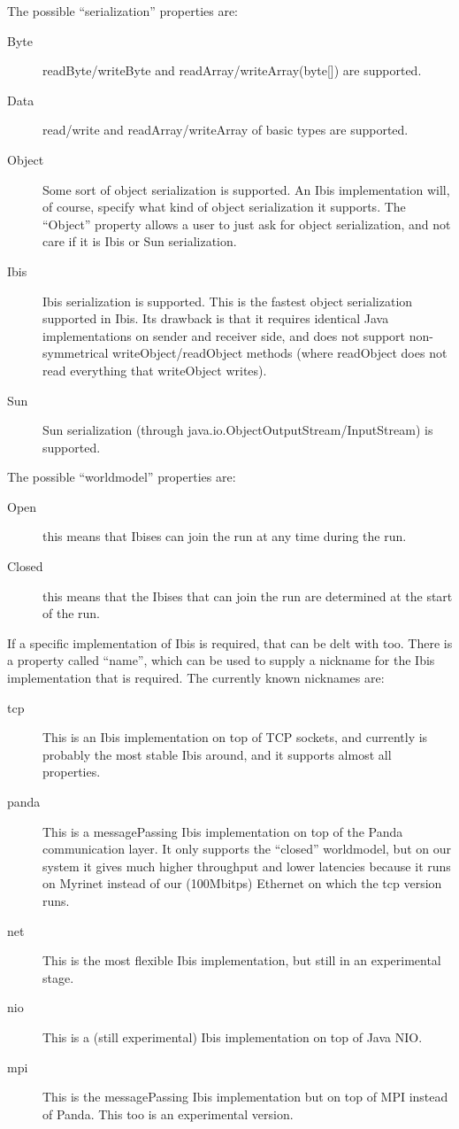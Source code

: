 \documentclass[10pt]{article}
\begin{document}
The possible ``serialization'' properties are:
\begin{description}
\item[Byte]
readByte/writeByte and readArray/writeArray(byte[]) are supported.
\item[Data]
read/write and readArray/writeArray of basic types are supported.
\item[Object]
Some sort of object serialization is supported. An Ibis implementation
will, of course, specify what kind of object serialization it supports.
The ``Object'' property allows a user to just ask for object
serialization, and not care if it is Ibis or Sun serialization.
\item[Ibis]
Ibis serialization is supported.
This is the fastest object serialization supported in Ibis. Its drawback
is that it requires identical Java implementations on sender and
receiver side, and does not support
non-symmetrical writeObject/readObject methods (where readObject does not
read everything that writeObject writes).
\item[Sun]
Sun serialization (through java.io.ObjectOutputStream/InputStream) is
supported.
\end{description}

The possible ``worldmodel'' properties are:
\begin{description}
\item[Open]
this means that Ibises can join the run at any time during the run.
\item[Closed]
this means that the Ibises that can join the run are determined
at the start of the run.
\end{description}

If a specific implementation of Ibis is required, that can be delt with too.
There is a property called ``name'', which can be used to supply a nickname
for the Ibis implementation that is required.
The currently known nicknames are:
\begin{description}
\item[tcp]
This is an Ibis implementation on top of TCP sockets, and currently is
probably the most stable Ibis around, and it supports almost all properties.
\item[panda]
This is a messagePassing Ibis implementation on top of the Panda
communication layer. It only supports the ``closed'' worldmodel,
but on our system it gives much higher throughput and lower latencies
because it runs on Myrinet instead of our (100Mbitps) Ethernet on which
the tcp version runs.
\item[net]
This is the most flexible Ibis implementation, but still in an experimental
stage.
\item[nio]
This is a (still experimental) Ibis implementation on top of Java NIO.
\item[mpi]
This is the messagePassing Ibis implementation but on top of MPI instead
of Panda. This too is an experimental version.
\end{description}
\end{document}
